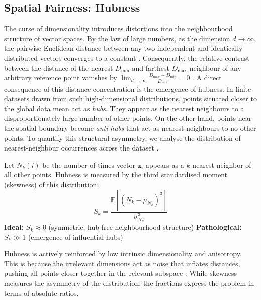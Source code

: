 \subsection{Spatial Fairness: Hubness}
\label{sec:hubness}

The curse of dimensionality introduces distortions into the neighbourhood structure of vector spaces. By the law of large numbers, as the dimension $d \to \infty$, the pairwise Euclidean distance between any two independent and identically distributed vectors converges to a constant \citep[p. 172 f.]{Bishop2024}\citep{Beyer1999_NNMeaningful}. Consequently, the relative contrast between the distance of the nearest $D_{\min}$ and farthest $D_{\max}$ neighbour of any arbitrary reference point vanishes by $ \lim_{d \to \infty} \frac{D_{\max} - D_{\min}}{D_{\min}} = 0 $ \cite{Beyer1999_NNMeaningful}.
A direct consequence of this distance concentration is the emergence of hubness. In finite datasets drawn from such high-dimensional distributions, points situated closer to the global data mean act as \emph{hubs}. They appear as the nearest neighbours to a disproportionately large number of other points. On the other hand, points near the spatial boundary become \emph{anti-hubs} that act as nearest neighbours to no other points. To quantify this structural asymmetry, we analyse the distribution of nearest-neighbour occurrences across the dataset \citep{Radovanovic2010_Hubs,feldbauer2019comprehensive,feldbauer_fast_2018}.

\begin{metricbox}
Let $N_k(i)$ be the number of times vector $\mathbf{z}_i$ appears as a $k$-nearest neighbor of all other points. Hubness is measured by the third standardised moment (skewness) of this distribution:
\begin{equation}
    S_k = \frac{\mathbb{E}\left[(N_k - \mu_{N_k})^3\right]}{\sigma_{N_k}^3}
    \label{met:hubness_skewness}
\end{equation}
\textbf{Ideal:} $S_k \approx 0$ (symmetric, hub-free neighbourhood structure) \quad \textbf{Pathological:} $S_k \gg 1$ (emergence of influential hubs)
\end{metricbox}

Hubness is actively reinforced by low intrinsic dimensionality and anisotropy. This is because the irrelevant dimensions act as noise that inflates distances, pushing all points closer together in the relevant subspace \cite{Radovanovic2010_Hubs, feldbauer2019comprehensive}. While skewness measures the asymmetry of the distribution, the fractions express the problem in terms of absolute ratios.

